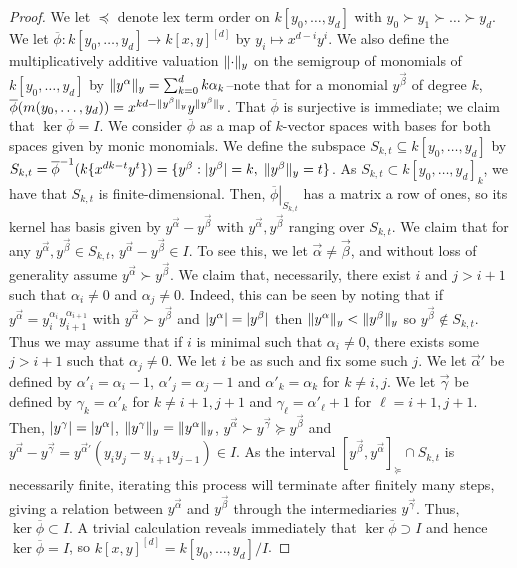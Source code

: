 \documentclass[english,letter,doublesided]{article}
\let\avec=\vec
\renewcommand\vec{\mathbf}
\newcommand{\evat}[3]{\left. #1\right|_{#2}^{#3}}
\DeclarePairedDelimiter\abs{\lvert}{\rvert}%
\DeclarePairedDelimiter\norm{\lVert}{\rVert}%
\newcommand{\prob}[1]{\setcounter{section}{#1-1}\section{}}
\theoremstyle{remark}
\theoremstyle{definition}
\newcommand{\restr}[2]{{\evat{#1}{#2}{}}}
\newcommand{\bph}{\overline{\phi}}
\newcommand{\ny}[1]{\norm{#1}_y}
\newcommand{\ya}{y^{\avec{\alpha}}}
\newcommand{\yap}{y^{\avec{\alpha}'}}
\newcommand{\yb}{y^{\avec{\beta}}}
\newcommand{\yg}{y^{\avec{\gamma}}}
\begin{document}
\begin{proof} We let $\preceq$ denote lex term order on $k[y_0,\dots,y_d]$ with $y_0\succ y_1\succ\dots\succ y_d$.
	We let $\bph:k[y_0,\dots,y_d]\to k[x,y]^{[d]}$ by $y_i\mapsto x^{d-i}y^i$. We also define the multiplicatively additive valuation $\norm{\cdot}_y$ on the semigroup of monomials of $k[y_0,\dots,y_d]$ by $\norm{y^{\avec{\alpha}}}_y=\sum_{k=0}^dk\alpha_k$--note that for a monomial $y^{\avec{\beta}}$ of degree $k$, $\bph(m(y_0,\dots,y_d))=x^{kd-\ny{y^{\avec{\beta}}}}y^{\ny{y^{\avec{\beta}}}}$. That $\bph$ is surjective is immediate; we claim that $\ker \bph=I$. We consider $\bph$ as a map of $k$-vector spaces with bases for both spaces given by monic monomials. We define the subspace $S_{k,t}\subseteq k[y_0,\dots,y_d]$ by $S_{k,t}=\bph^{-1}(k\{x^{dk-t}y^t\})=\{y^{\avec{\beta}}:\abs{y^{\avec{\beta}}}=k,\;\ny{y^{\avec{\beta}}}=t\}$. As $S_{k,t}\subset k[y_0,\dots,y_d]_k$, we have that $S_{k,t}$ is finite-dimensional. Then, $\restr{\bph}{S_{k,t}}$ has a matrix a row of ones, so its kernel has basis given by $\ya-\yb$ with $\ya,\yb$ ranging over $S_{k,t}$. We claim that for any $y^{\avec{\alpha}},y^{\avec{\beta}}\in S_{k,t}$, $y^{\avec{\alpha}}-y^{\avec{\beta}}\in I$. To see this, we let $\avec{\alpha}\neq \avec{\beta}$, and without loss of generality assume $\ya \succ \yb$. We claim that, necessarily, there exist $i$ and $j>i+1$ such that $\alpha_i\neq 0$ and $\alpha_j\neq 0$. Indeed, this can be seen by noting that if $\ya=y_i^{\alpha_i}y_{i+1}^{\alpha_{i+1}}$ with $\ya\succ \yb$ and $\abs{\ya}=\abs{\yb}$ then $\ny{\ya}<\ny{\yb}$ so $\yb \notin S_{k,t}$. Thus we may assume that if $i$ is minimal such that $\alpha_i\neq 0$, there exists some $j>i+1$ such that $\alpha_j\neq 0$. We let $i$ be as such and fix some such $j$. We let $\avec{\alpha}'$ be defined by $\alpha'_i=\alpha_i-1$, $\alpha'_j=\alpha_j-1$ and $\alpha'_k=\alpha_k$ for $k\neq i,j$. We let $\avec{\gamma}$ be defined by $\gamma_k=\alpha'_k$ for $k\neq i+1,j+1$ and $\gamma_\ell=\alpha'_\ell+1$ for $\ell=i+1,j+1$. Then, $\abs{y^{\avec{\gamma}}}=\abs{\ya}$, $\ny{\yg}=\ny{\ya}$, $\ya\succ\yg \succeq\yb$ and $\ya-\yg=\yap(y_iy_j-y_{i+1}y_{j-1})\in I$. As the interval $[\yb,\ya]_{\succeq}\cap S_{k,t}$ is necessarily finite, iterating this process will terminate after finitely many steps, giving a relation between $\ya$ and $\yb$ through the intermediaries $\yg$. Thus, $\ker\bph\subset I$. A trivial calculation reveals immediately that $\ker \bph \supset I$ and hence $\ker \bph =I$, so $k[x,y]^{[d]}=k[y_0,\dots,y_d]/I$.
\end{proof}
	\prob{7}
	\prob{8}
\end{document}

